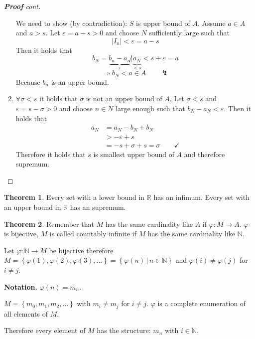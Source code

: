 \documentclass[a4paper,landscape,twocolumn]{article}
\theoremstyle{definition}
\newtheorem{theorem}{Theorem}
\newcommand\set[1]{\left\{#1\right\}}
\newcommand\setdef[2]{\left\{#1\,|\,#2\right\}}
\newcommand\abs[1]{\left|#1\right|}
\begin{document}
\begin{proof}[\textbf{Proof} cont]
\begin{enumerate}
      We need to show (by contradiction):
      $S$ is upper bound of $A$. Assume $a \in A$ and $a > s$.
      Let $\varepsilon = a - s > 0$ and choose $N$ sufficiently large such that
      \[ \abs{I_n} < \varepsilon = a - s \]
      Then it holds that
      \[
          b_N
          = \underbrace{b_n - a_n}_{\varepsilon} \not|
          \underbrace{a_N}_{< s} < s + \varepsilon
          = a
      \]
      \[ \Rightarrow b_N < a \in A \qquad\lightning \]
      Because $b_n$ is an upper bound.

    \item
      $\forall \sigma < s$ it holds that $\sigma$ is not an upper bound of $A$.
      Let $\sigma < s$ and $\varepsilon = s - \sigma > 0$ and choose $n \in N$
      large enough such that $b_N - a_N < \varepsilon$. Then it holds that
      \begin{align*}
        a_N &= a_N - b_N + b_N \\
            &> -\varepsilon + s \\
            &= -s + \sigma + s = \sigma \qquad \checkmark
      \end{align*}
      Therefore it holds that $s$ is smallest upper bound of $A$ and therefore
      supremum.
  \end{enumerate}
\end{proof}

\begin{theorem}
  Every set with a lower bound in $\mathbb R$ has an infimum.
  Every set with an upper bound in $\mathbb R$ has an supremum.
\end{theorem}

\begin{theorem}
  Remember that $M$ has the same cardinality like $A$ if $\varphi: M \rightarrow A$.
  $\varphi$ is bijective, $M$ is called countably infinite
  if $M$ has the same cardinality like $\mathbb N$.

  Let $\varphi: \mathbb N \rightarrow M$ be bijective therefore
  $M = \set{\varphi(1), \varphi(2), \varphi(3), \ldots} = \setdef{\varphi(n)}{n \in \mathbb N}$
  and $\varphi(i) \neq \varphi(j)$ for $i \neq j$.

  \textbf{Notation.} $\varphi(n) = m_n$.

  $M = \set{m_0, m_1, m_2, \ldots}$ with $m_i \neq m_j$ for $i \neq j$.
  $\varphi$ is a complete enumeration of all elements of $M$.

  Therefore every element of $M$ has the structure: $m_n$ with $i \in \mathbb N$.
\end{theorem}
\end{document}
